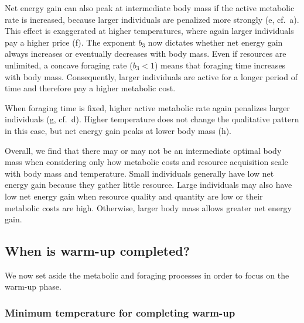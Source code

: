 Net energy gain can also peak at intermediate body mass if the active metabolic rate is increased, because larger individuals are penalized more strongly (e, cf.~a).
This effect is exaggerated at higher temperatures, where again larger individuals pay a higher price (f).
The exponent $b_3$ now dictates whether net energy gain always increases or eventually decreases with body mass.
Even if resources are unlimited, a concave foraging rate ($b_3 < 1$) means that foraging time increases with body mass.
Consequently, larger individuals are active for a longer period of time and therefore pay a higher metabolic cost.

When foraging time is fixed, higher active metabolic rate again penalizes larger individuals (g, cf.~d).
Higher temperature does not change the qualitative pattern in this case, but net energy gain peaks at lower body mass (h).

Overall, we find that there may or may not be an intermediate optimal body mass when considering only how metabolic costs and resource acquisition scale with body mass and temperature.
Small individuals generally have low net energy gain because they gather little resource. %
Large individuals may also have low net energy gain when resource quality and quantity are low or their metabolic costs are high.
Otherwise, larger body mass allows greater net energy gain.


\subsection*{When is warm-up completed?}

We now set aside the metabolic and foraging processes in order to focus on the warm-up phase.

\subsubsection*{Minimum temperature for completing warm-up}


